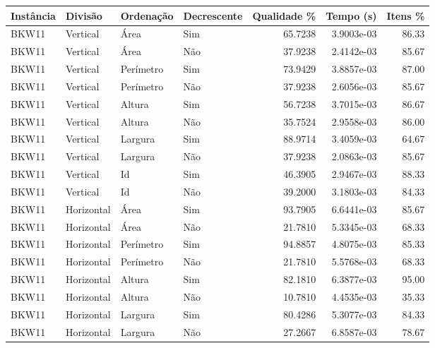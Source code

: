 \begin{tabular}{llllrrr}
    \hline
    Instância & Divisão     & Ordenação & Decrescente & Qualidade \% & Tempo (s)  & Itens \% \\
    \hline
    BKW11     & Vertical    & Área      & Sim         & 65.7238      & 3.9003e-03 & 86.33    \\
    BKW11     & Vertical    & Área      & Não         & 37.9238      & 2.4142e-03 & 85.67    \\
    BKW11     & Vertical    & Perímetro & Sim         & 73.9429      & 3.8857e-03 & 87.00    \\
    BKW11     & Vertical    & Perímetro & Não         & 37.9238      & 2.6056e-03 & 85.67    \\
    BKW11     & Vertical    & Altura    & Sim         & 56.7238      & 3.7015e-03 & 86.67    \\
    BKW11     & Vertical    & Altura    & Não         & 35.7524      & 2.9558e-03 & 86.00    \\
    BKW11     & Vertical    & Largura   & Sim         & 88.9714      & 3.4059e-03 & 64.67    \\
    BKW11     & Vertical    & Largura   & Não         & 37.9238      & 2.0863e-03 & 85.67    \\
    BKW11     & Vertical    & Id        & Sim         & 46.3905      & 2.9467e-03 & 88.33    \\
    BKW11     & Vertical    & Id        & Não         & 39.2000      & 3.1803e-03 & 84.33    \\
    BKW11     & Horizontal  & Área      & Sim         & 93.7905      & 6.6441e-03 & 85.67    \\
    BKW11     & Horizontal  & Área      & Não         & 21.7810      & 5.3345e-03 & 68.33    \\
    BKW11     & Horizontal  & Perímetro & Sim         & 94.8857      & 4.8075e-03 & 85.33    \\
    BKW11     & Horizontal  & Perímetro & Não         & 21.7810      & 5.5768e-03 & 68.33    \\
    BKW11     & Horizontal  & Altura    & Sim         & 82.1810      & 6.3877e-03 & 95.00    \\
    BKW11     & Horizontal  & Altura    & Não         & 10.7810      & 4.4535e-03 & 35.33    \\
    BKW11     & Horizontal  & Largura   & Sim         & 80.4286      & 5.3077e-03 & 84.33    \\
    BKW11     & Horizontal  & Largura   & Não         & 27.2667      & 6.8587e-03 & 78.67    \\

\end{tabular}
